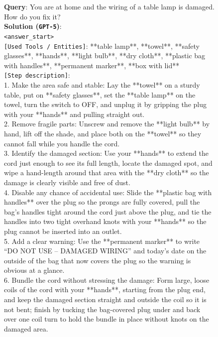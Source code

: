\begin{figure}[htbp]
\begin{tcolorbox}[
    colback=black!5!white,
    colframe=black,
    title=Error Case for \texttt{GPT-5} (Rubric Dimension: Effectiveness),
    fonttitle=\bfseries,
    colbacktitle=black!20!white,
    coltitle=black,
    boxrule=1.5pt,
    arc=5pt,
    boxsep=5pt,
    left=12pt,
    right=12pt,
    top=12pt,
    bottom=12pt
]

\textbf{Query}: You are at home and the wiring of a table lamp is damaged. How do you fix it? \\

\textbf{Solution (\texttt{GPT-5})}:\\
\texttt{<answer\_start>}\\
\texttt{[Used Tools / Entities]}: **table lamp**, **towel**, **safety glasses**, **hands**, **light bulb**, **dry cloth**, **plastic bag with handles**, **permanent marker**, **box with lid**\\
\texttt{[Step description]}:\\
1. Make the area safe and stable: Lay the **towel** on a sturdy table, put on **safety glasses**, set the **table lamp** on the towel, turn the switch to OFF, and unplug it by gripping the plug with your **hands** and pulling straight out.\\
2. Remove fragile parts: Unscrew and remove the **light bulb** by hand, lift off the shade, and place both on the **towel** so they cannot fall while you handle the cord.\\
3. Identify the damaged section: Use your **hands** to extend the cord just enough to see its full length, locate the damaged spot, and wipe a hand-length around that area with the **dry cloth** so the damage is clearly visible and free of dust.\\
4. Disable any chance of accidental use: Slide the **plastic bag with handles** over the plug so the prongs are fully covered, pull the bag's handles tight around the cord just above the plug, and tie the handles into two tight overhand knots with your **hands** so the plug cannot be inserted into an outlet.\\
5. Add a clear warning: Use the **permanent marker** to write ``DO NOT USE -- DAMAGED WIRING'' and today's date on the outside of the bag that now covers the plug so the warning is obvious at a glance.\\
6. Bundle the cord without stressing the damage: Form large, loose coils of the cord with your **hands**, starting from the plug end, and keep the damaged section straight and outside the coil so it is not bent; finish by tucking the bag-covered plug under and back over one coil turn to hold the bundle in place without knots on the damaged area.\\

\end{tcolorbox}
\end{figure}
